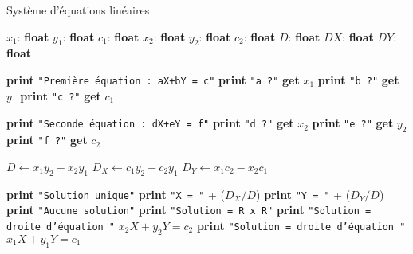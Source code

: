 \documentclass[a4paper,10pt]{report}
\newcommand\Printtt[1]{\State \textbf{print }\texttt{"#1"}}
\newcommand\Get{\State \textbf{get }}
\begin{document}
\begin{algorithm}
	\caption{Système d'équations linéaires}
	\begin{algorithmic}
		\Vars
			\State $x_1$: \textbf{float}
			\State $y_1$: \textbf{float}
			\State $c_1$: \textbf{float}
			\State $x_2$: \textbf{float}
			\State $y_2$: \textbf{float}
			\State $c_2$: \textbf{float}
			\State $D$: \textbf{float}
			\State $DX$: \textbf{float}
			\State $DY$: \textbf{float}
		\EndVars
		
		\Statex
		\Begin
			\Printtt{Première équation : aX+bY = c} 
			\Printtt{a ?}
			\Get $x_1$
			\Printtt{b ?}
			\Get $y_1$
			\Printtt{c ?}
			\Get $c_1$
			
			\Printtt{Seconde équation : dX+eY = f}
			\Printtt{d ?}
			\Get $x_2$
			\Printtt{e ?}
			\Get $y_2$
			\Printtt{f ?}
			\Get $c_2$
			
			\Statex {}
			\State $D \leftarrow x_1 y_2-x_2y_1$ 
			\State $D_X \leftarrow c_1y_2-c_2y_1$
			\State $D_Y \leftarrow x_1c_2-x_2c_1$
			
			\Statex
				\Printtt{Solution unique}
				\Printtt{X = } + ($D_X / D$)
				\Printtt{Y = } + ($D_Y / D$)
				\Printtt{Aucune solution}
					\Printtt{Solution = R x R}
				\Else
					\Printtt{Solution = droite d'équation } $x_2X + y_2Y =c_2$
				\EndIf
			\Else
				\Printtt{Solution = droite d'équation } $x_1X + y_1Y =c_1$
			\EndIf
		\End
	\end{algorithmic}
\end{algorithm}
\end{document}

